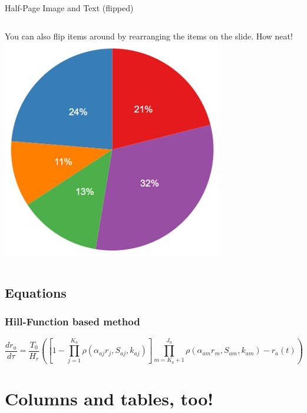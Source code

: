\documentclass[aspectratio=169]{beamer} %
\begin{document}
	\begin{frame}{Half-Page Image and Text (flipped)}
		\begin{columns}
			You can also flip items around by rearranging the items on the slide. How neat!
			\includegraphics[width=\textwidth]{generic_piechart.png}
		\end{columns}
	\end{frame}
	
	
	\subsection{Equations}
	
\begin{frame}
\frametitle{Hill-Function based method}
\begin{equation*} \label{eq: main odes10-main1-last}
\frac{dr_a}{d\tau}=\frac{T_0}{H_r} \left(\left[1-\prod_{j=1}^{K_a}\rho(\alpha_{aj} r_{j},S_{aj}, k_{aj})\right]\prod_{m=K_a+1}^{J_a}\rho(\alpha_{am} r_{m},S_{am}, k_{am})-r_a(t)\right)\end{equation*}

\end{frame}
	
	\section{Columns and tables, too!}
	
\end{document}
